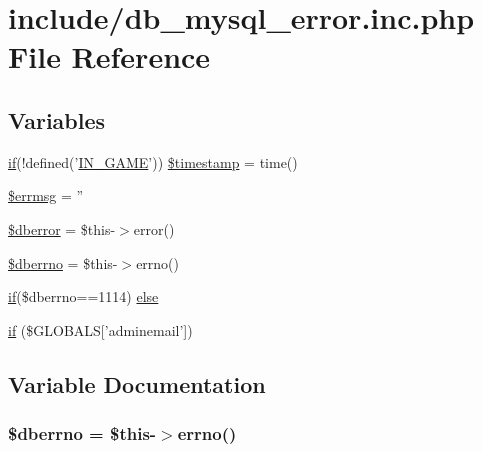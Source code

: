 \hypertarget{db__mysql__error_8inc_8php}{\section{include/db\+\_\+mysql\+\_\+error.inc.\+php File Reference}
\label{db__mysql__error_8inc_8php}
}
\subsection*{Variables}
\begin{DoxyCompactItemize}
\item 
\hyperlink{login__old_8php_a4ac1118c2e44c513a674bc1793ba6c90}{if}(!defined('\hyperlink{templates_2install_8php_a12c82f3d28569a3f80804f1e72cef14c}{I\+N\+\_\+\+G\+A\+M\+E}')) \hyperlink{db__mysql__error_8inc_8php_ab7b466236e0884db72ab7133299338c2}{\$timestamp} = time()
\item 
\hyperlink{db__mysql__error_8inc_8php_a36253ac3f7114f140a51305bd2b67245}{\$errmsg} = ''
\item 
\hyperlink{db__mysql__error_8inc_8php_abd14d508ec59cf214416a2a8edd41dc6}{\$dberror} = \$this-\/$>$error()
\item 
\hyperlink{db__mysql__error_8inc_8php_ad7eb5597850773ca02766e4b4266da16}{\$dberrno} = \$this-\/$>$errno()
\item 
\hyperlink{login__old_8php_a4ac1118c2e44c513a674bc1793ba6c90}{if}(\$dberrno==1114) \hyperlink{db__mysql__error_8inc_8php_acaeeb29a7692bea15a5bfdfe89b980d0}{else}
\item 
\hyperlink{db__mysql__error_8inc_8php_abde64c608c957ba01f855603994a9935}{if} (\$G\+L\+O\+B\+A\+L\+S\mbox{[}'adminemail'\mbox{]})
\end{DoxyCompactItemize}


\subsection{Variable Documentation}
\hypertarget{db__mysql__error_8inc_8php_ad7eb5597850773ca02766e4b4266da16}{
\subsubsection[{\$dberrno}]{\setlength{\rightskip}{0pt plus 5cm}\$dberrno = \$this-\/$>$errno()}}\label{db__mysql__error_8inc_8php_ad7eb5597850773ca02766e4b4266da16}


